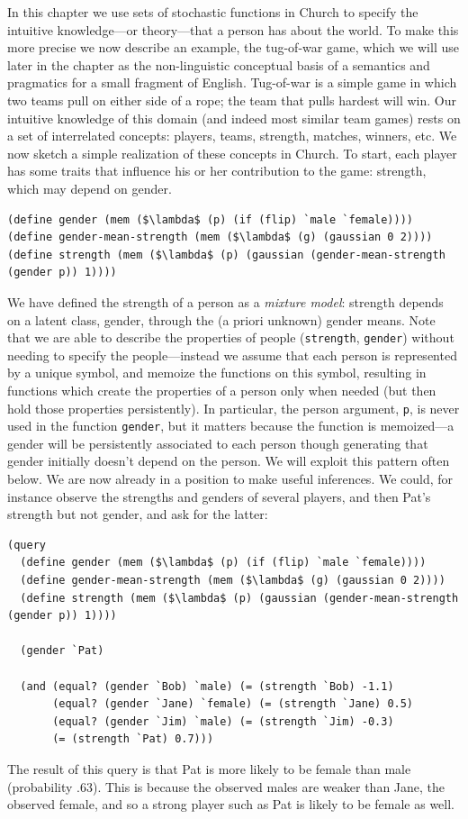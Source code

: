 \documentclass[pdfextras]{handbook}
\begin{document}
In this chapter we use sets of stochastic functions in Church to specify the intuitive knowledge---or theory---that a person has about the world. 
To make this more precise we now describe an example, the tug-of-war game, which we will use later in the chapter as the non-linguistic conceptual basis of a semantics and pragmatics for a small fragment of English. 
Tug-of-war is a simple game in which two teams pull on either side of a rope; the team that pulls hardest will win. 
Our intuitive knowledge of this domain (and indeed most similar team games) rests on a set of interrelated concepts: players, teams, strength, matches, winners, etc. 
We now sketch a simple realization of these concepts in Church. 
To start, each player has some traits that influence his or her contribution to the game: strength, which may depend on gender.
\begin{lstlisting}[mathescape]
(define gender (mem ($\lambda$ (p) (if (flip) `male `female))))
(define gender-mean-strength (mem ($\lambda$ (g) (gaussian 0 2))))
(define strength (mem ($\lambda$ (p) (gaussian (gender-mean-strength (gender p)) 1))))
\end{lstlisting}
We have defined the strength of a person as a \emph{mixture model}: strength depends on a latent class, gender, through the (a priori unknown) gender means. 
Note that we are able to describe the properties of people (\lstinline{strength}, \lstinline{gender}) without needing to specify the people---instead we assume that each person is represented by a unique symbol, and memoize the functions on this symbol, resulting in functions which create the properties of a person only when needed (but then hold those properties persistently). 
In particular, the person argument, \lstinline{p}, is never used in the function \lstinline{gender}, but it matters because the function is memoized---a gender will be persistently associated to each person though generating that gender initially doesn't depend on the person. 
We will exploit this pattern often below.
We are now already in a position to make useful inferences. 
We could, for instance observe the strengths and genders of several players, and then Pat's strength but not gender, and ask for the latter:
\begin{lstlisting}[mathescape]
(query
  (define gender (mem ($\lambda$ (p) (if (flip) `male `female))))
  (define gender-mean-strength (mem ($\lambda$ (g) (gaussian 0 2))))
  (define strength (mem ($\lambda$ (p) (gaussian (gender-mean-strength (gender p)) 1))))
  
  (gender `Pat)
  
  (and (equal? (gender `Bob) `male) (= (strength `Bob) -1.1)
       (equal? (gender `Jane) `female) (= (strength `Jane) 0.5)
       (equal? (gender `Jim) `male) (= (strength `Jim) -0.3)
       (= (strength `Pat) 0.7)))
\end{lstlisting}
The result of this query is that Pat is more likely to be female than male (probability .63). 
This is because the observed males are weaker than Jane, the observed female, and so a strong player such as Pat is likely to be female as well.
\end{document}
